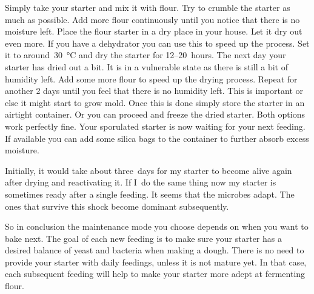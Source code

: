 \begin{description}
Simply take your starter and mix it with flour. Try to crumble the starter as
much as possible. Add more flour continuously until you notice that there is no
moisture left. Place the flour starter in a dry place in your house. Let it
dry out even more. If you have a dehydrator you can use this to speed up the
process. Set it to around~\qty{30}{\degreeCelsius} and dry the starter for 12--20~hours. The next
day your starter has dried out a bit. It is in a vulnerable state as there is still a bit
of humidity left. Add some more flour to speed up the drying process. Repeat
for another 2 days until you feel that there is no humidity left. This is
important or else it might start to grow mold. Once this is done simply store the
starter in an airtight container. Or you can proceed and freeze
the dried starter. Both options work perfectly fine. Your sporulated starter
is now waiting for your next feeding. If available you can add some silica
bags to the container to further absorb excess moisture.

Initially, it would take about three~days for my starter to become alive again
after drying and reactivating it. If I~do the same thing now my starter is
sometimes ready after a single feeding. It seems that the microbes adapt. The ones
that survive this shock become dominant subsequently.
\end{description}

So in conclusion the maintenance mode you choose depends on when you want to bake next.
The goal of each new feeding is to make sure your starter
has a desired balance of yeast and bacteria when making a dough. There is no need to provide your
starter with daily feedings, unless it is not mature yet. In that case, each
subsequent feeding will help to make your starter more adept at fermenting
flour.
